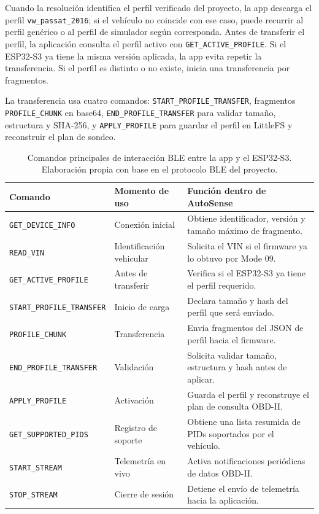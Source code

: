 \documentclass[12pt,letterpaper]{report}
\begin{document}
Cuando la resolución identifica el perfil verificado del proyecto, la app descarga el perfil \texttt{vw\_passat\_2016}; si el vehículo no coincide con ese caso, puede recurrir al perfil genérico o al perfil de simulador según corresponda. Antes de transferir el perfil, la aplicación consulta el perfil activo con \texttt{GET\_ACTIVE\_PROFILE}. Si el ESP32-S3 ya tiene la misma versión aplicada, la app evita repetir la transferencia. Si el perfil es distinto o no existe, inicia una transferencia por fragmentos.

La transferencia usa cuatro comandos: \texttt{START\_PROFILE\_TRANSFER}, fragmentos \texttt{PROFILE\_CHUNK} en base64, \texttt{END\_PROFILE\_TRANSFER} para validar tamaño, estructura y SHA-256, y \texttt{APPLY\_PROFILE} para guardar el perfil en LittleFS y reconstruir el plan de sondeo.

\begin{table}[!htbp]
\centering
\footnotesize
\caption{Comandos principales de interacción BLE entre la app y el ESP32-S3. Elaboración propia con base en el protocolo BLE del proyecto.}
\label{tab:system-interaction-ble-commands}
\setlength{\tabcolsep}{3pt}
\begin{tabular}{@{}>{\raggedright\arraybackslash}p{} >{\raggedright\arraybackslash}p{} >{\raggedright\arraybackslash}p{}@{}}
\toprule
\textbf{Comando} & \textbf{Momento de uso} & \textbf{Función dentro de AutoSense} \\
\midrule
\texttt{GET\_DEVICE\_INFO} & Conexión inicial & Obtiene identificador, versión y tamaño máximo de fragmento. \\
\texttt{READ\_VIN} & Identificación vehicular & Solicita el VIN si el firmware ya lo obtuvo por Mode 09. \\
\texttt{GET\_ACTIVE\_PROFILE} & Antes de transferir & Verifica si el ESP32-S3 ya tiene el perfil requerido. \\
\texttt{START\_PROFILE\_TRANSFER} & Inicio de carga & Declara tamaño y hash del perfil que será enviado. \\
\texttt{PROFILE\_CHUNK} & Transferencia & Envía fragmentos del JSON de perfil hacia el firmware. \\
\texttt{END\_PROFILE\_TRANSFER} & Validación & Solicita validar tamaño, estructura y hash antes de aplicar. \\
\texttt{APPLY\_PROFILE} & Activación & Guarda el perfil y reconstruye el plan de consulta OBD-II. \\
\texttt{GET\_SUPPORTED\_PIDS} & Registro de soporte & Obtiene una lista resumida de PIDs soportados por el vehículo. \\
\texttt{START\_STREAM} & Telemetría en vivo & Activa notificaciones periódicas de datos OBD-II. \\
\texttt{STOP\_STREAM} & Cierre de sesión & Detiene el envío de telemetría hacia la aplicación. \\
\bottomrule
\end{tabular}
\end{table}
\end{document}
